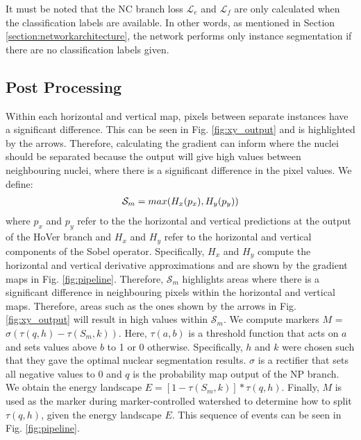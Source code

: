 \documentclass[journal]{IEEEtran}
\begin{document}
	It must be noted that the NC branch loss $\mathcal{L}_{e}$ and $\mathcal{L}_{f}$ are only calculated when the classification labels are available. In other words, as mentioned in Section \ref{section:networkarchitecture}, the network performs only instance segmentation if there are no classification labels given.

    \subsection{Post Processing}  \label{section:postprocessing}
Within each horizontal and vertical map, pixels between separate instances have a significant difference. This can be seen in Fig. \ref{fig:xy_output} and is highlighted by the arrows. Therefore, calculating the gradient can inform where the nuclei should be separated because the output will give high values between neighbouring nuclei, where there is a significant difference in the pixel values. We define:
	\begin{equation}
	\begin{split}
	\small
	\mathcal{S}_m = max(H_x(p_{x}), H_y(p_{y}))
	\end{split}
	\end{equation}
	where $p_x$ and $p_y$ refer to the the horizontal and vertical predictions at the output of the HoVer branch and $H_x$ and $H_y$ refer to the horizontal and vertical components of the Sobel operator. Specifically, $H_x$ and $H_y$ compute the horizontal and vertical derivative approximations and are shown by the gradient maps in Fig. \ref{fig:pipeline}. Therefore, $\mathcal{S}_m$ highlights areas where there is a significant difference in neighbouring pixels within the horizontal and vertical maps. Therefore, areas such as the ones shown by the arrows in Fig. \ref{fig:xy_output} will result in high values within $\mathcal{S}_m$. We compute markers $M$ = $\sigma(\tau(q, h) - \tau(S_m, k))$. Here, $\tau(a, b)$ is a threshold function that acts on $a$ and sets values above $b$ to 1 or 0 otherwise. Specifically, $h$ and $k$ were chosen such that they gave the optimal nuclear segmentation results. $\sigma$ is a rectifier that sets all negative values to 0 and $q$ is the probability map output of the NP branch. We obtain the energy landscape $E=[1-\tau(S_m, k)]*\tau(q, h)$. Finally, $M$ is used as the marker during marker-controlled watershed to determine how to split $\tau(q, h)$, given the energy landscape $E$. This sequence of events can be seen in Fig. \ref{fig:pipeline}.
	
\end{document}
